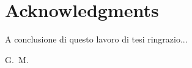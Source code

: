 

\cleardoublepage
{}
{}
\thispagestyle{plain}

\bigskip

\begingroup
\let\clearpage\relax
\let\cleardoublepage\relax
\let\cleardoublepage\relax

\chapter*{Acknowledgments}

A conclusione di questo lavoro di tesi ringrazio...

\bigskip

\hfill G.~M.

\endgroup
